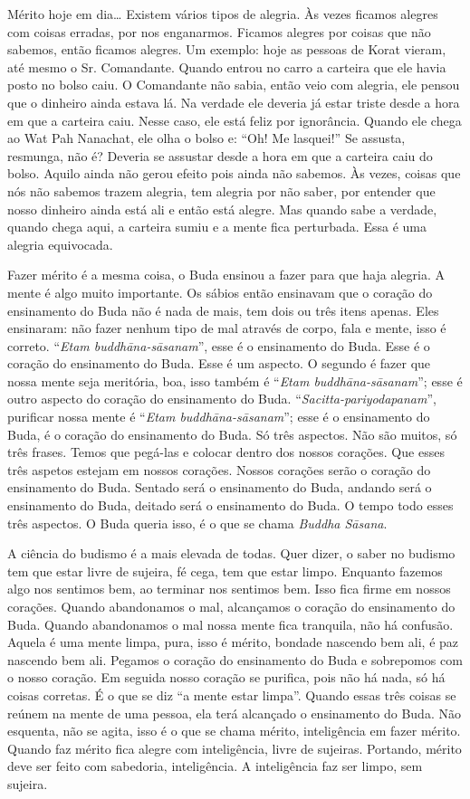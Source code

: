 Mérito hoje em dia… Existem vários tipos de alegria. Às vezes
ficamos alegres com coisas erradas, por nos enganarmos. Ficamos alegres
por coisas que não sabemos, então ficamos alegres. Um exemplo: hoje as
pessoas de Korat vieram, até mesmo o Sr. Comandante. Quando entrou no
carro a carteira que ele havia posto no bolso caiu. O Comandante não
sabia, então veio com alegria, ele pensou que o dinheiro ainda estava
lá. Na verdade ele deveria já estar triste desde a hora em que a
carteira caiu. Nesse caso, ele está feliz por ignorância. Quando ele
chega ao Wat Pah Nanachat, ele olha o bolso e: “Oh! Me lasquei!” Se
assusta, resmunga, não é? Deveria se assustar desde a hora em que a
carteira caiu do bolso. Aquilo ainda não gerou efeito pois ainda não
sabemos. Às vezes, coisas que nós não sabemos trazem alegria, tem
alegria por não saber, por entender que nosso dinheiro ainda está ali e
então está alegre. Mas quando sabe a verdade, quando chega aqui, a
carteira sumiu e a mente fica perturbada. Essa é uma alegria
equivocada. 

Fazer mérito é a mesma coisa, o Buda ensinou a fazer para que haja
alegria. A mente é algo muito importante. Os sábios então ensinavam que
o coração do ensinamento do Buda não é nada de mais, tem dois ou três
itens apenas. Eles ensinaram: não fazer nenhum tipo de mal através de
corpo, fala e mente, isso é correto. “\textit{Etam
buddhāna-sāsanam}”, esse é o ensinamento do Buda. Esse é o coração
do ensinamento do Buda. Esse é um aspecto. O segundo é fazer que nossa
mente seja meritória, boa, isso também é “\textit{Etam
buddhāna-sāsanam}”; esse é outro aspecto do coração do ensinamento
do Buda. “\textit{Sacitta-pariyodapanam}”, purificar nossa mente é
“\textit{Etam buddhāna-sāsanam}”; esse é o ensinamento do Buda, é o
coração do ensinamento do Buda. Só três aspectos. Não são muitos, só
três frases. Temos que pegá-las e colocar dentro dos nossos corações.
Que esses três aspetos estejam em nossos corações. Nossos corações
serão o coração do ensinamento do Buda. Sentado será o ensinamento do
Buda, andando será o ensinamento do Buda, deitado será o ensinamento do
Buda. O tempo todo esses três aspectos. O Buda queria isso, é o que se
chama \textit{Buddha Sāsana}. 

A ciência do budismo é a mais elevada de todas. Quer dizer, o saber
no budismo tem que estar livre de sujeira, fé cega, tem que estar
limpo. Enquanto fazemos algo nos sentimos bem, ao terminar nos sentimos
bem. Isso fica firme em nossos corações. Quando abandonamos o mal,
alcançamos o coração do ensinamento do Buda. Quando abandonamos o mal
nossa mente fica tranquila, não há confusão. Aquela é uma mente limpa,
pura, isso é mérito, bondade nascendo bem ali, é paz nascendo bem ali.
Pegamos o coração do ensinamento do Buda e sobrepomos com o nosso
coração. Em seguida nosso coração se purifica, pois não há nada, só há
coisas corretas. É o que se diz “a mente estar limpa”. Quando essas
três coisas se reúnem na mente de uma pessoa, ela terá alcançado o
ensinamento do Buda. Não esquenta, não se agita, isso é o que se chama
mérito, inteligência em fazer mérito. Quando faz mérito fica alegre com
inteligência, livre de sujeiras. Portando, mérito deve ser feito com
sabedoria, inteligência. A inteligência faz ser limpo, sem sujeira. 


